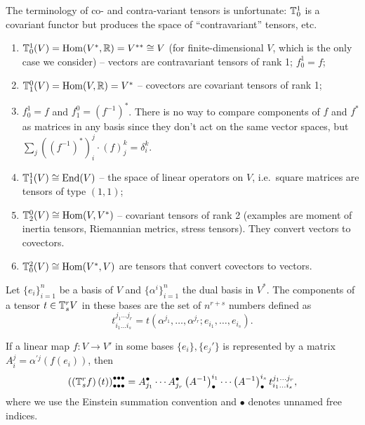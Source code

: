\begin{rem}
    The terminology of co- and contra-variant tensors is unfortunate: $\mathbb{T}_0^1$ is a covariant functor but produces the space of ``contravariant'' tensors, etc.
\end{rem}

\begin{example}
\begin{enumerate}
    \item $\mathbb{T}_0^1(V)=\operatorname{Hom}(V^\ast,\mathbb{R} )=V^{\ast\ast}\cong V$ (for finite-dimensional $V$, which is the only case we consider) -- vectors are contravariant tensors of rank 1; $f^1_0=f$;
    \item $\mathbb{T}_1^0(V)=\operatorname{Hom}(V,\mathbb{R} )=V^\ast$ -- covectors are covariant tensors of rank 1;
    \item $f^1_0=f$ and $f^0_1=\left(f^{-1}\right)^\ast$. There is no way to compare components of $f$ and $f^\ast$ as matrices in any basis since they don't act on the same vector spaces, but $\sum_j \left(\left(f^{-1}\right)^\ast\right)_i^j \cdot (f)_j^k=\delta_i^k$.
    \item $\mathbb{T}^1_1(V)\cong \operatorname{End}(V)$ -- the space of linear operators on $V$, i.e.\ square matrices are tensors of type $(1,1)$;
    \item $\mathbb{T}^0_2(V)\cong\operatorname{Hom}(V,V^\ast)$ -- covariant tensors of rank 2 (examples are moment of inertia tensors, Riemannian metrics, stress tensors). They convert vectors to covectors.
    \item $\mathbb{T}^2_0(V)\cong\operatorname{Hom}(V^\ast ,V)$ are tensors that convert covectors to vectors.
\end{enumerate}
\end{example}

\begin{defn}
    Let $\{e_i\}_{i=1}^n$ be a basis of $V$ and $\{\alpha^i\}_{i=1}^n$ the dual basis in $V^\ast$. The components of a tensor $t\in \mathbb{T}^r_s V$ in these bases are the set of $n^{r+s}$ numbers defined as
    \[
    t_{i_1\ldots i_s}^{j_1\ldots j_r}=t\left(\alpha^{j_1},\ldots,\alpha^{j_r};e_{i_1},\ldots,e_{i_s}\right).
    \]
\end{defn}

If a linear map $f:V\to V'$ in some bases $\{e_i\},\{e_j'\}$ is represented by a matrix $A_i^j=\alpha^{\prime j} (f(e_i))$, then 
\[
\left(\left(\mathbb{T}^r_s f\right)(t)\right)^{\bullet\bullet\bullet}_{\bullet\bullet\bullet}=A^\bullet_{j_1}\cdots A_{j_r}^\bullet \left(A^{-1}\right)^{i_1}_\bullet \cdots \left(A^{-1}\right)^{i_s}_\bullet t_{i_1\ldots i_s}^{j_1\ldots j_r},
\]
where we use the Einstein summation convention and $\bullet$ denotes unnamed free indices.

